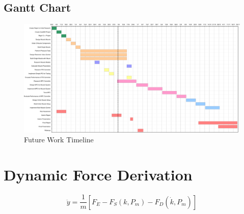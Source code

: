 \documentclass[11pt,a4paper]{article}
\begin{document}
\begin{appendices}


\begin{landscape}
\section{Gantt Chart}
\label{sub:gantt_chart}
\begin{figure}[ht]
    \centering
    \advance\leftskip-4cm
    \advance\rightskip-2cm
    \includegraphics[width=1.4\textwidth]{GanttChart-crop.pdf}
    \caption{Future Work Timeline}
    \label{fig:gantt_chart}
\end{figure}
\end{landscape}
\newpage

\section{Dynamic Force Derivation}
\begin{equation}
    \ddot{y} = \frac{1}{m}[F_E-F_S(k,P_m)-F_D(\dot{k},P_m)]
\end{equation}


\end{appendices}
\end{document}
